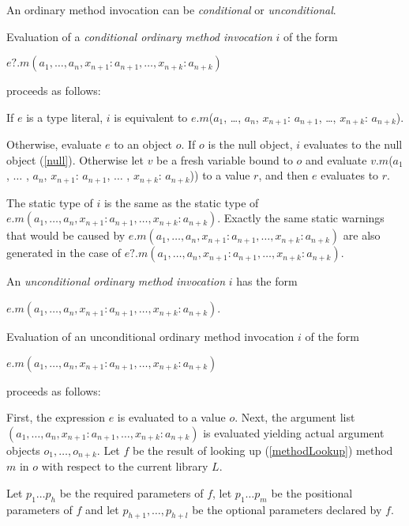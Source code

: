 \documentclass{article}
\newcommand{\code}[1]{{\sf #1}}
\begin{document}
\LMHash{}
An ordinary method invocation can be {\em conditional} or {\em unconditional}.

\LMHash{}
Evaluation of a {\em conditional ordinary method invocation} $i$ of the form

\LMHash{}
$e?.m(a_1, \ldots , a_n, x_{n+1}: a_{n+1}, \ldots , x_{n+k}: a_{n+k})$

\LMHash{}
proceeds as follows:

\LMHash{}
If $e$ is a type literal, $i$ is equivalent to \code{$e$.$m$($a_1$, \ldots , $a_n$, $x_{n+1}$: $a_{n+1}$, \ldots , $x_{n+k}$: $a_{n+k}$)}.

\LMHash{}
Otherwise, evaluate $e$ to an object $o$.
If $o$ is the null object, $i$ evaluates to the null object (\ref{null}).
Otherwise let $v$ be a fresh variable bound to $o$ and evaluate
\code{$v$.$m$($a_1$, $\ldots$ , $a_n$, $x_{n+1}$: $a_{n+1}$, $\ldots$ , $x_{n+k}$: $a_{n+k}$))} to a value $r$, and then $e$ evaluates to $r$.


\LMHash{}
The static type of $i$ is the same as the static type of $e.m(a_1, \ldots , a_n, x_{n+1}: a_{n+1}, \ldots , x_{n+k}: a_{n+k})$. Exactly the same static warnings that would be caused by $e.m(a_1, \ldots , a_n, x_{n+1}: a_{n+1}, \ldots , x_{n+k}: a_{n+k})$ are also generated in the case of $e?.m(a_1, \ldots , a_n, x_{n+1}: a_{n+1}, \ldots , x_{n+k}: a_{n+k})$.

\LMHash{}
An {\em unconditional ordinary method invocation} $i$ has the form

$e.m(a_1, \ldots , a_n, x_{n+1}: a_{n+1}, \ldots , x_{n+k}: a_{n+k})$.

\LMHash{}
Evaluation of an unconditional ordinary method invocation $i$ of the form

$e.m(a_1, \ldots , a_n, x_{n+1}: a_{n+1}, \ldots , x_{n+k}: a_{n+k})$

proceeds as follows:

\LMHash{}
First, the expression $e$ is evaluated to a value $o$. Next, the argument list $(a_1, \ldots , a_n, x_{n+1}: a_{n+1}, \ldots , x_{n+k}: a_{n+k})$ is evaluated yielding actual argument objects $o_1, \ldots , o_{n+k}$. Let $f$ be the result of looking up (\ref{methodLookup}) method $m$  in $o$ with respect to the current library $L$.

\LMHash{}
Let $p_1 \ldots p_h$ be the required parameters of $f$,  let $p_1 \ldots p_m$ be the positional parameters of $f$ and let $p_{h+1}, \ldots, p_{h+l}$ be the optional parameters declared by $f$.

\end{document}
